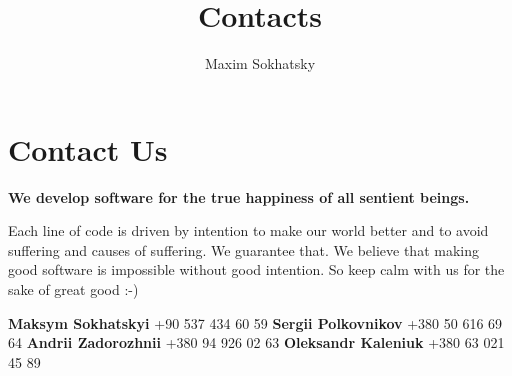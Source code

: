 \documentclass[11pt]{article}
\begin{document}
\title{Contacts}
\author{Maxim Sokhatsky}


\section*{Contact Us}

\textbf{We develop software for the true happiness of all sentient beings.}

Each line of code is driven by intention to make our world better and to
avoid suffering and causes of suffering. We guarantee that.
We believe that making good software is impossible without good intention.
So keep calm with us for the sake of great good :-)


\textbf{Maksym Sokhatskyi}  +90 537 434 60 59 \@br
\textbf{Sergii Polkovnikov}  +380 50 616 69 64 \@br
\textbf{Andrii Zadorozhnii}  +380 94 926 02 63 \@br
\textbf{Oleksandr Kaleniuk}  +380 63 021 45 89 \@br

\end{document}
